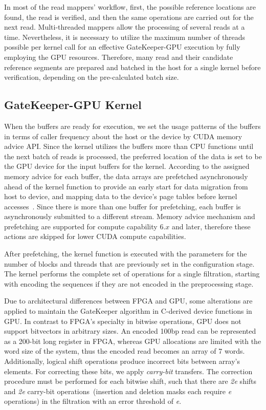 In most of the read mappers' workflow, first, the possible reference locations are found, the read is verified, and then the same operations are carried out for the next read. Multi-threaded mappers allow the processing of several reads at a time. Nevertheless, it is necessary to utilize the maximum number of threads possible per kernel call for an effective GateKeeper-GPU execution by fully employing the GPU resources. Therefore, many read and their candidate reference segments are prepared and batched in the host for a single kernel before verification, depending on the pre-calculated batch size.

\subsection{GateKeeper-GPU Kernel}
When the buffers are ready for execution, we set the usage patterns of the buffers in terms of caller frequency about the host or the device by CUDA memory advice API. Since the kernel utilizes the buffers more than CPU functions until the next batch of reads is processed, the preferred location of the data is set to be the GPU device for the input buffers for the kernel. According to the assigned memory advice for each buffer, the data arrays are prefetched asynchronously ahead of the kernel function to provide an early start for data migration from host to device, and mapping data to the device's page tables before kernel accesses~\cite{programmingGuide}. Since there is more than one buffer for prefetching, each buffer is asynchronously submitted to a different stream. Memory advice mechanism and prefetching are supported for compute capability $6.x$ and later, therefore these actions are skipped for lower CUDA compute capabilities.

After prefetching, the kernel function is executed with the parameters for the number of blocks and threads that are previously set in the configuration stage. The kernel performs the complete set of operations for a single filtration, starting with encoding the sequences if they are not encoded in the preprocessing stage. 

Due to architectural differences between FPGA and GPU, some alterations are applied to maintain the GateKeeper algorithm in C-derived device functions in GPU. In contrast to FPGA's specialty in bitwise operations, GPU does not support bitvectors in arbitrary sizes. An encoded 100bp read can be represented as a 200-bit long register in FPGA, whereas GPU allocations are limited with the word size of the system, thus the encoded read becomes an array of 7 words. Additionally, logical shift operations produce incorrect bits between array's elements. For correcting these bits, we apply \textit{carry-bit} transfers. The correction procedure must be performed for each bitwise shift, such that there are \textit{2e} shifts and \textit{2e} carry-bit operations~(insertion and deletion masks each require \textit{e} operations) in the filtration with an error threshold of \textit{e}. 

